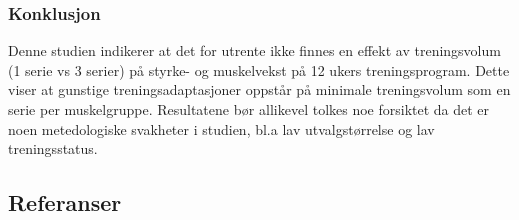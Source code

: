 \documentclass[
  letterpaper,
  DIV=11,
  numbers=noendperiod]{scrartcl}
\begin{document}
\hypertarget{konklusjon}{%
\subsubsection{Konklusjon}\label{konklusjon}}

Denne studien indikerer at det for utrente ikke finnes en effekt av
treningsvolum (1 serie vs 3 serier) på styrke- og muskelvekst på 12
ukers treningsprogram. Dette viser at gunstige treningsadaptasjoner
oppstår på minimale treningsvolum som en serie per muskelgruppe.
Resultatene bør allikevel tolkes noe forsiktet da det er noen
metedologiske svakheter i studien, bl.a lav utvalgstørrelse og lav
treningsstatus.

\hypertarget{referanser}{%
\subsection*{Referanser}\label{referanser}}
\end{document}

